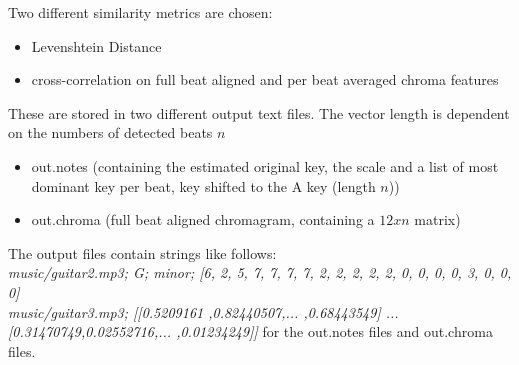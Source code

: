 Two different similarity metrics are chosen: 
\begin{itemize}
	\item Levenshtein Distance
	\item cross-correlation on full beat aligned and per beat averaged chroma features
\end{itemize}
These are stored in two different output text files. The vector length is dependent on the numbers of detected beats $n$
\begin{itemize}
	\item out.notes (containing the estimated original key, the scale and a list of most dominant key per beat, key shifted to the A key (length $n$))
	\item out.chroma (full beat aligned chromagram, containing a $12 x n$ matrix)
\end{itemize}
The output files contain strings like follows:\\
\textit{music/guitar2.mp3; G; minor; [6, 2, 5, 7, 7, 7, 7, 2, 2, 2, 2, 2, 0, 0, 0, 0, 3, 0, 0, 0]}\\
\textit{music/guitar3.mp3; [[0.5209161 ,0.82440507,... ,0.68443549] ... [0.31470749,0.02552716,... ,0.01234249]]}
for the out.notes files and out.chroma files. 